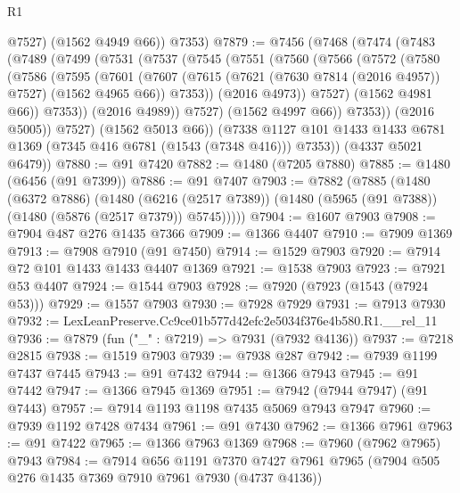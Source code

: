 \begin{lexlean}{R1}
\begin{coremodule}
          @7527)
        (@1562 @4949 @66))
      @7353)
@7879 := @7456
    (@7468
      (@7474
        (@7483
          (@7489
            (@7499
              (@7531
                (@7537
                  (@7545
                    (@7551
                      (@7560
                        (@7566
                          (@7572
                            (@7580
                              (@7586
                                (@7595
                                  (@7601
                                    (@7607
                                      (@7615
                                        (@7621 (@7630 @7814 (@2016 @4957)) @7527)
                                        (@1562 @4965 @66))
                                      @7353))
                                  (@2016 @4973))
                                @7527)
                              (@1562 @4981 @66))
                            @7353))
                        (@2016 @4989))
                      @7527)
                    (@1562 @4997 @66))
                  @7353))
              (@2016 @5005))
            @7527)
          (@1562 @5013 @66))
        (@7338 @1127 @101 @1433 @1433 @6781 @1369 (@7345 @416 @6781 (@1543 (@7348 @416))) @7353))
      (@4337 @5021 @6479))
@7880 := @91 @7420
@7882 := @1480 (@7205 @7880)
@7885 := @1480 (@6456 (@91 @7399))
@7886 := @91 @7407
@7903 := @7882
    (@7885
      (@1480
        (@6372 @7886)
        (@1480
          (@6216 (@2517 @7389))
          (@1480 (@5965 (@91 @7388)) (@1480 (@5876 (@2517 @7379)) @5745)))))
@7904 := @1607 @7903
@7908 := @7904 @487 @276 @1435 @7366
@7909 := @1366 @4407
@7910 := @7909 @1369
@7913 := @7908 @7910 (@91 @7450)
@7914 := @1529 @7903
@7920 := @7914 @72 @101 @1433 @1433 @4407 @1369
@7921 := @1538 @7903
@7923 := @7921 @53 @4407
@7924 := @1544 @7903
@7928 := @7920 (@7923 (@1543 (@7924 @53)))
@7929 := @1557 @7903
@7930 := @7928 @7929
@7931 := @7913 @7930
@7932 := LexLeanPreserve.Cc9ce01b577d42efc2e5034f376e4b580.R1.__rel_11
@7936 := @7879 (fun ("_" : @7219) => @7931 (@7932 @4136))
@7937 := @7218 @2815
@7938 := @1519 @7903
@7939 := @7938 @287
@7942 := @7939 @1199 @7437 @7445
@7943 := @91 @7432
@7944 := @1366 @7943
@7945 := @91 @7442
@7947 := @1366 @7945 @1369
@7951 := @7942 (@7944 @7947) (@91 @7443)
@7957 := @7914 @1193 @1198 @7435 @5069 @7943 @7947
@7960 := @7939 @1192 @7428 @7434
@7961 := @91 @7430
@7962 := @1366 @7961
@7963 := @91 @7422
@7965 := @1366 @7963 @1369
@7968 := @7960 (@7962 @7965) @7943
@7984 := @7914
    @656
    @1191
    @7370
    @7427
    @7961
    @7965
    (@7904 @505 @276 @1435 @7369 @7910 @7961 @7930 (@4737 @4136))

\end{coremodule}
\end{lexlean}
